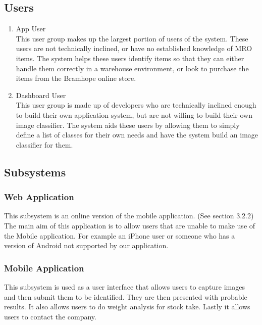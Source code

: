 \documentclass[a4paper, 11pt]{article}
\begin{document}
\subsection{Users}
\begin{enumerate}
    \item App User\\
    This user group makes up the largest portion of users of the system. These users are not technically inclined, or have no established knowledge of MRO items. The system helps these users identify items so that they can either handle them correctly in a warehouse environment, or look to purchase the items from the Bramhope online store.
    \item Dashboard User\\
    This user group is made up of developers who are technically inclined enough to build their own application system, but are not willing to build their own image classifier. The system aids these users by allowing them to simply define a list of classes for their own needs and have the system build an image classifier for them.
\end{enumerate}


\subsection{Subsystems}
\subsubsection{Web Application}
This subsystem is an online version of the mobile application. (See section 3.2.2) The main aim of this application is to allow users that are unable to make use of the Mobile application. For example an iPhone user or someone who has a version of Android not supported by our application.
\subsubsection{Mobile Application}
This subsystem is used as a user interface that allows users to capture images and then submit them to be identified. They are then presented with probable results. It also allows users to do weight analysis for stock take. Lastly it allows users to contact the company.
\end{document}
